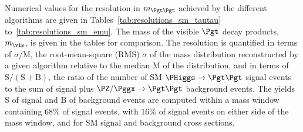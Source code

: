Numerical values for the resolution in $m_{\Pgt\Pgt}$ achieved by the different algorithms are given in Tables~\ref{tab:resolutions_sm_tautau} to~\ref{tab:resolutions_sm_emu}.
The mass of the visible $\Pgt$ decay products, $m_{\vis}$, is given in the tables for comparison.
The resolution is quantified in terms of $\sigma/\textrm{M}$, the root-mean-square (RMS) $\sigma$ of the mass distribution reconstructed by a given algorithm relative to the median $\textrm{M}$ of the distribution,
and in terms of $\textrm{S}/(\textrm{S} + \textrm{B})$, the ratio of the number of SM $\PHiggs \to \Pgt\Pgt$ signal events to the sum of signal plus $\PZ/\Pggx \to \Pgt\Pgt$ background events.
The yields $\textrm{S}$ of signal and $\textrm{B}$ of background events are computed within a mass window containing $68\%$ of signal events,
with $16\%$ of signal events on either side of the mass window, and for SM signal and background cross sections.

